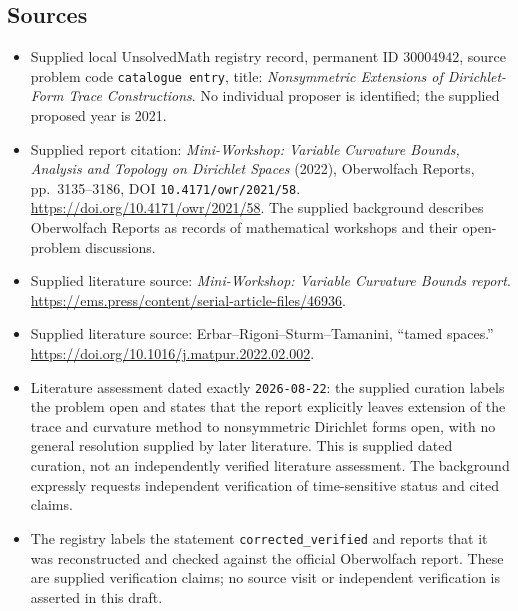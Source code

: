 \documentclass[11pt]{article}
\begin{document}
\subsection{Sources}
\begin{itemize}
\item Supplied local UnsolvedMath registry record, permanent ID \(30004942\), source problem code \texttt{catalogue entry}, title: \emph{Nonsymmetric Extensions of Dirichlet-Form Trace Constructions}. No individual proposer is identified; the supplied proposed year is 2021.
\item Supplied report citation: \emph{Mini-Workshop: Variable Curvature Bounds, Analysis and Topology on Dirichlet Spaces} (2022), Oberwolfach Reports, pp.\ 3135--3186, DOI \texttt{10.4171/owr/2021/58}. \url{https://doi.org/10.4171/owr/2021/58}. The supplied background describes Oberwolfach Reports as records of mathematical workshops and their open-problem discussions.
\item Supplied literature source: \emph{Mini-Workshop: Variable Curvature Bounds report}. \url{https://ems.press/content/serial-article-files/46936}.
\item Supplied literature source: Erbar--Rigoni--Sturm--Tamanini, ``tamed spaces.'' \url{https://doi.org/10.1016/j.matpur.2022.02.002}.
\item Literature assessment dated exactly \texttt{2026-08-22}: the supplied curation labels the problem open and states that the report explicitly leaves extension of the trace and curvature method to nonsymmetric Dirichlet forms open, with no general resolution supplied by later literature. This is supplied dated curation, not an independently verified literature assessment. The background expressly requests independent verification of time-sensitive status and cited claims.
\item The registry labels the statement \texttt{corrected\_verified} and reports that it was reconstructed and checked against the official Oberwolfach report. These are supplied verification claims; no source visit or independent verification is asserted in this draft.
\end{itemize}
\end{document}
